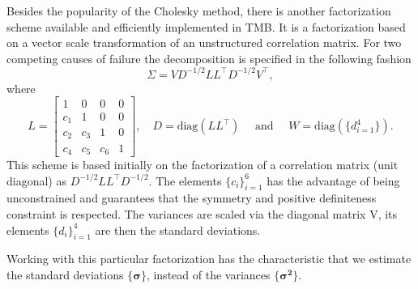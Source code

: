 Besides the popularity of the Cholesky method, there is another
factorization scheme available and efficiently implemented in TMB. It is
a factorization based on a vector scale transformation of an
unstructured correlation matrix. For two competing causes of failure the
decomposition is specified in the following fashion
\[
  \Sigma = VD^{-1/2}LL^{\top}D^{-1/2}V^{\top},
\]
where
\[
 L = \begin{bmatrix}
      1&0&0&0\\
      c_{1}&1&0&0\\
      c_{2}&c_{3}&1&0\\
      c_{4}&c_{5}&c_{6}&1
     \end{bmatrix},\quad D = \text{diag}(LL^{\top})
 \quad\text{ and }\quad W = \text{diag}(\{d_{i=1}^{4}\}).
\]
This scheme is based initially on the factorization of a correlation
matrix (unit diagonal) as \(D^{-1/2}LL^{\top}D^{-1/2}\). The elements
\(\{c_{i}\}_{i=1}^{6}\) has the advantage of being unconstrained and
guarantees that the symmetry and positive definiteness constraint is
respected. The variances are scaled via the diagonal matrix V, its
elements \(\{d_{i}\}_{i=1}^{4}\) are then the standard deviations.

Working with this particular factorization has the characteristic that
we estimate the standard deviations \(\{\bm{\sigma}\}\), instead of the
variances \(\{\bm{\sigma^{2}}\}\).


